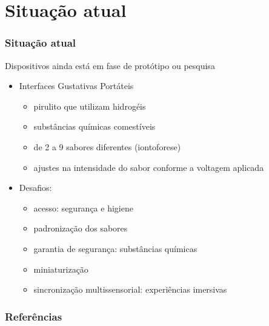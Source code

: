 \documentclass{beamer}
\begin{document}
\section{Situação atual}
\begin{frame}
  \frametitle{Situação atual}
  Dispositivos ainda está em fase de protótipo ou pesquisa \\
  \begin{itemize}
    \item Interfaces Gustativas Portáteis
    \begin{itemize}
      \item pirulito que utilizam hidrogéis
      \item substâncias químicas comestíveis
      \item de 2 a 9 sabores diferentes (iontoforese)
      \item ajustes na intensidade do sabor conforme a voltagem aplicada
    \end{itemize}
    \item Desafios:
    \begin{itemize}
      \item acesso: segurança e higiene
      \item padronização dos sabores
      \item garantia de segurança: substâncias químicas
      \item miniaturização
      \item sincronização multissensorial: experiências imersivas
    \end{itemize}
  \end{itemize}
\end{frame}



\begin{frame}
  \frametitle{Referências}
  \begingroup
  \footnotesize
    
    
  \endgroup
\end{frame}
\end{document}
